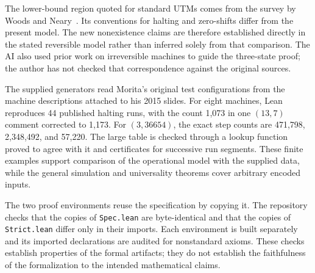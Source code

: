 The lower-bound region quoted for standard UTMs comes from the survey by
Woods and Neary~\cite{WoodsNeary09}. Its conventions for halting and
zero-shifts differ from the present model. The new nonexistence claims are
therefore established directly in the stated reversible model rather than
inferred solely from that comparison. The AI also used prior work on
irreversible machines to guide the three-state proof; the author has not
checked that correspondence against the original sources.

The supplied generators read Morita's original test configurations from
the machine descriptions attached to his 2015 slides. For eight machines,
Lean reproduces 44 published halting runs, with the count 1,073 in one
$(13,7)$ comment corrected to 1,173. For $(3,36654)$, the exact step counts
are 471,798, 2,348,492, and 57,220. The large table is checked through a
lookup function proved to agree with it and certificates for successive
run segments. These finite examples support comparison of the operational
model with the supplied data, while the general simulation and universality
theorems cover arbitrary encoded inputs.

The two proof environments reuse the specification by copying it.
The repository checks that the copies of \texttt{Spec.lean} are byte-identical
and that the copies of \texttt{Strict.lean} differ only in their imports.
Each environment is built separately and its imported declarations are
audited for nonstandard axioms. These checks establish properties of the
formal artifacts; they do not establish the faithfulness of the formalization
to the intended mathematical claims.

